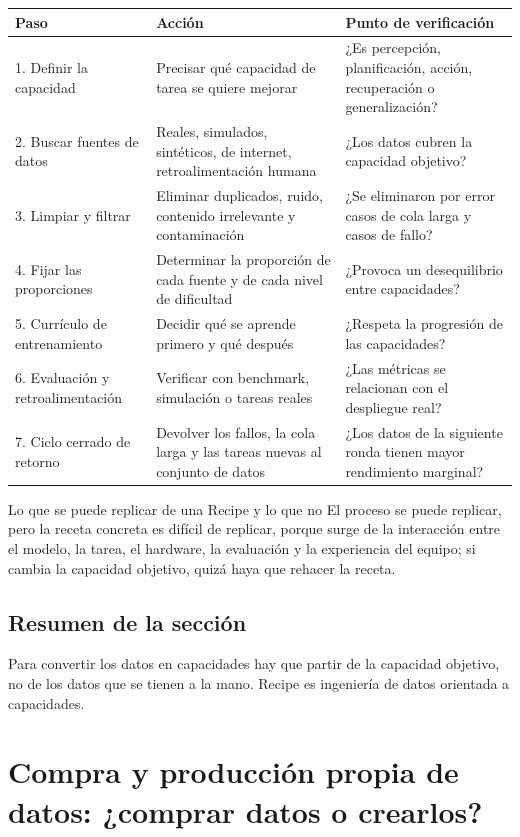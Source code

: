 \documentclass[a4paper]{article}
\begin{document}
\noindent\begin{longtable}{p{}p{}p{}}
\toprule
Paso & Acción & Punto de verificación \\
\midrule
1. Definir la capacidad & Precisar qué capacidad de tarea se quiere mejorar & ¿Es percepción, planificación, acción, recuperación o generalización? \\
2. Buscar fuentes de datos & Reales, simulados, sintéticos, de internet, retroalimentación humana & ¿Los datos cubren la capacidad objetivo? \\
3. Limpiar y filtrar & Eliminar duplicados, ruido, contenido irrelevante y contaminación & ¿Se eliminaron por error casos de cola larga y casos de fallo? \\
4. Fijar las proporciones & Determinar la proporción de cada fuente y de cada nivel de dificultad & ¿Provoca un desequilibrio entre capacidades? \\
5. Currículo de entrenamiento & Decidir qué se aprende primero y qué después & ¿Respeta la progresión de las capacidades? \\
6. Evaluación y retroalimentación & Verificar con benchmark, simulación o tareas reales & ¿Las métricas se relacionan con el despliegue real? \\
7. Ciclo cerrado de retorno & Devolver los fallos, la cola larga y las tareas nuevas al conjunto de datos & ¿Los datos de la siguiente ronda tienen mayor rendimiento marginal? \\
\bottomrule
\end{longtable}

\begin{knowledgebox}{Lo que se puede replicar de una Recipe y lo que no}
El proceso se puede replicar, pero la receta concreta es difícil de replicar, porque surge de la interacción entre el modelo, la tarea, el hardware, la evaluación y la experiencia del equipo; si cambia la capacidad objetivo, quizá haya que rehacer la receta.
\end{knowledgebox}

\subsection{Resumen de la sección}

Para convertir los datos en capacidades hay que partir de la capacidad objetivo, no de los datos que se tienen a la mano. Recipe es ingeniería de datos orientada a capacidades.
\section{Compra y producción propia de datos: ¿comprar datos o crearlos?}
\end{document}
